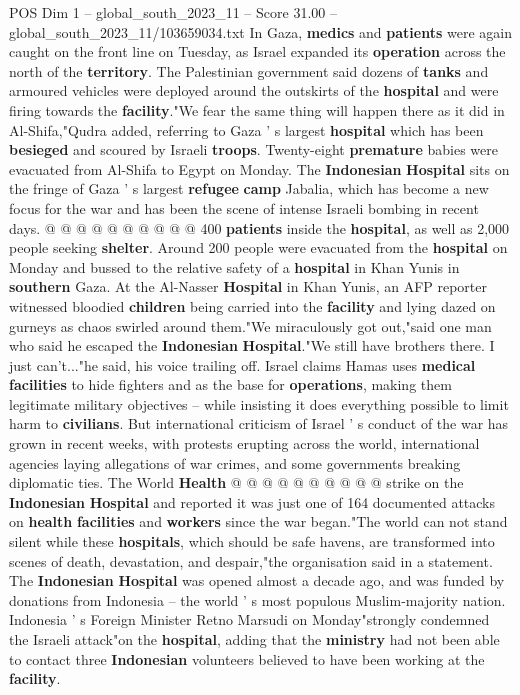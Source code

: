 \begin{textsample}{POS Dim 1 – global\_south\_2023\_11 – Score 31.00 – global\_south\_2023\_11/103659034.txt}
In Gaza, \textbf{medics} and \textbf{patients} were again caught on the front line on Tuesday, as Israel expanded its \textbf{operation} across the north of the \textbf{territory}.
The Palestinian government said dozens of \textbf{tanks} and armoured vehicles were deployed around the outskirts of the \textbf{hospital} and were firing towards the \textbf{facility}."We fear the same thing will happen there as it did in Al-Shifa,"Qudra added, referring to Gaza ' s largest \textbf{hospital} which has been \textbf{besieged} and scoured by Israeli \textbf{troops}.
Twenty-eight \textbf{premature} babies were evacuated from Al-Shifa to Egypt on Monday.
The \textbf{Indonesian} \textbf{Hospital} sits on the fringe of Gaza ' s largest \textbf{refugee} \textbf{camp} Jabalia, which has become a new focus for the war and has been the scene of intense Israeli bombing in recent days. @ @ @ @ @ @ @ @ @ @ 400 \textbf{patients} inside the \textbf{hospital}, as well as 2,000 people seeking \textbf{shelter}.
Around 200 people were evacuated from the \textbf{hospital} on Monday and bussed to the relative safety of a \textbf{hospital} in Khan Yunis in \textbf{southern} Gaza.
At the Al-Nasser \textbf{Hospital} in Khan Yunis, an AFP reporter witnessed bloodied \textbf{children} being carried into the \textbf{facility} and lying dazed on gurneys as chaos swirled around them."We miraculously got out,"said one man who said he escaped the \textbf{Indonesian} \textbf{Hospital}."We still have brothers there.
I just can't..."he said, his voice trailing off.
Israel claims Hamas uses \textbf{medical} \textbf{facilities} to hide fighters and as the base for \textbf{operations}, making them legitimate military objectives -- while insisting it does everything possible to limit harm to \textbf{civilians}.
But international criticism of Israel ' s conduct of the war has grown in recent weeks, with protests erupting across the world, international agencies laying allegations of war crimes, and some governments breaking diplomatic ties.
The World \textbf{Health} @ @ @ @ @ @ @ @ @ @ strike on the \textbf{Indonesian} \textbf{Hospital} and reported it was just one of 164 documented attacks on \textbf{health} \textbf{facilities} and \textbf{workers} since the war began."The world can not stand silent while these \textbf{hospitals}, which should be safe havens, are transformed into scenes of death, devastation, and despair,"the organisation said in a statement.
The \textbf{Indonesian} \textbf{Hospital} was opened almost a decade ago, and was funded by donations from Indonesia -- the world ' s most populous Muslim-majority nation.
Indonesia ' s Foreign Minister Retno Marsudi on Monday"strongly condemned the Israeli attack"on the \textbf{hospital}, adding that the \textbf{ministry} had not been able to contact three \textbf{Indonesian} volunteers believed to have been working at the \textbf{facility}.


\end{textsample}
